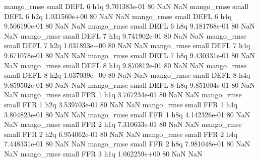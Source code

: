        mango_rmse      small     DEFL                 6                  h1q 9.701383e-01 80            NaN                NaN
       mango_rmse      small     DEFL                 6                  h2q 1.031560e+00 80            NaN                NaN
       mango_rmse      small     DEFL                 6                  h4q 9.506190e-01 80            NaN                NaN
       mango_rmse      small     DEFL                 6                  h8q 9.181768e-01 80            NaN                NaN
       mango_rmse      small     DEFL                 7                  h1q 9.741902e-01 80            NaN                NaN
       mango_rmse      small     DEFL                 7                  h2q 1.031893e+00 80            NaN                NaN
       mango_rmse      small     DEFL                 7                  h4q 9.671078e-01 80            NaN                NaN
       mango_rmse      small     DEFL                 7                  h8q 9.430331e-01 80            NaN                NaN
       mango_rmse      small     DEFL                 8                  h1q 9.870812e-01 80            NaN                NaN
       mango_rmse      small     DEFL                 8                  h2q 1.037039e+00 80            NaN                NaN
       mango_rmse      small     DEFL                 8                  h4q 9.859502e-01 80            NaN                NaN
       mango_rmse      small     DEFL                 8                  h8q 9.851004e-01 80            NaN                NaN
       mango_rmse      small      FFR                 1                  h1q 3.767234e-01 80            NaN                NaN
       mango_rmse      small      FFR                 1                  h2q 3.539703e-01 80            NaN                NaN
       mango_rmse      small      FFR                 1                  h4q 3.804823e-01 80            NaN                NaN
       mango_rmse      small      FFR                 1                  h8q 4.142326e-01 80            NaN                NaN
       mango_rmse      small      FFR                 2                  h1q 7.310633e-01 80            NaN                NaN
       mango_rmse      small      FFR                 2                  h2q 6.954062e-01 80            NaN                NaN
       mango_rmse      small      FFR                 2                  h4q 7.448331e-01 80            NaN                NaN
       mango_rmse      small      FFR                 2                  h8q 7.981048e-01 80            NaN                NaN
       mango_rmse      small      FFR                 3                  h1q 1.062259e+00 80            NaN                NaN
